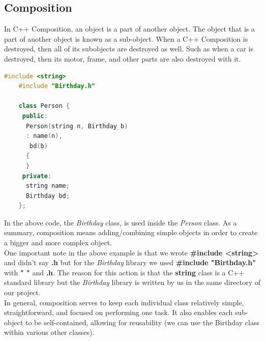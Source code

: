 \documentclass[12pt , a4paper]{article}
\newcommand{\hl}[1]{\colorbox{coolblack}{\color{cream}\textbf{#1}\color{black}}}
\begin{document}
	\subsection{Composition}
In C++ Composition, an object is a part of another object. The object that is a part of another object is known as a sub-object. When a C++ Composition is destroyed, then all of its subobjects are destroyed as well. Such as when a car is destroyed, then its motor, frame, and other parts are also destroyed with it.
	\begin{lstlisting}[language=C++]
	#include <string>
	#include "Birthday.h"
	
	class Person {
	 public:
	  Person(string n, Birthday b)
	  : name(n),
	   bd(b)
	  {
	  }
	 private:
	  string name;
	  Birthday bd;
	};
	\end{lstlisting}
In the above code, the \textit{Birthday} class, is used inside the \textit{Person} class. As a summary, composition means adding/combining simple objects in order to create a bigger and more complex object.\\
One important note in the above example is that we wrote \hl{\#include <string>} and didn't say \hl{.h} but for the \textit{Birthday} library we used \hl{\#include "Birthday.h"} with \textbf{" "} and \hl{.h}. The reason for this action is that the \textbf{string} class is a C++ standard library but the \textit{Birthday} library is written by us in the same directory of our project.\\
In general, composition serves to keep each individual class relatively simple, straightforward, and focused on performing one task. It also enables each sub-object to be self-contained, allowing for reusability (we can use the Birthday class within various other classes).
\end{document}
